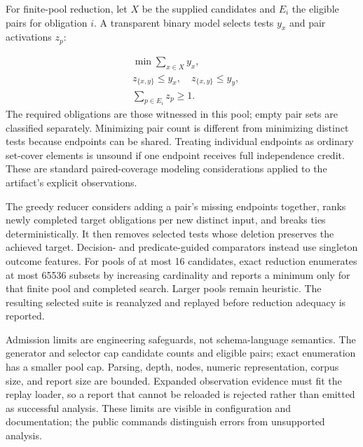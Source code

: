\documentclass[sigconf,nonacm]{acmart}
\begin{document}
For finite-pool reduction, let $X$ be the supplied candidates and $E_i$ the eligible pairs for obligation $i$. A transparent binary model selects tests $y_x$ and pair activations $z_p$:

\[
\begin{aligned}&\min\sum_{x\in X}y_x,\\&z_{\{x,y\}}\le y_x,\quad z_{\{x,y\}}\le y_y,\\&\sum_{p\in E_i}z_p\ge1.\end{aligned}
\]
The required obligations are those witnessed in this pool; empty pair sets are classified separately. Minimizing pair count is different from minimizing distinct tests because endpoints can be shared. Treating individual endpoints as ordinary set-cover elements is unsound if one endpoint receives full independence credit. These are standard paired-coverage modeling considerations applied to the artifact's explicit observations. \cite{ref2}

The greedy reducer considers adding a pair's missing endpoints together, ranks newly completed target obligations per new distinct input, and breaks ties deterministically. It then removes selected tests whose deletion preserves the achieved target. Decision- and predicate-guided comparators instead use singleton outcome features. For pools of at most 16 candidates, exact reduction enumerates at most 65536 subsets by increasing cardinality and reports a minimum only for that finite pool and completed search. Larger pools remain heuristic. The resulting selected suite is reanalyzed and replayed before reduction adequacy is reported.

Admission limits are engineering safeguards, not schema-language semantics. The generator and selector cap candidate counts and eligible pairs; exact enumeration has a smaller pool cap. Parsing, depth, nodes, numeric representation, corpus size, and report size are bounded. Expanded observation evidence must fit the replay loader, so a report that cannot be reloaded is rejected rather than emitted as successful analysis. These limits are visible in configuration and documentation; the public commands distinguish errors from unsupported analysis.
\end{document}
